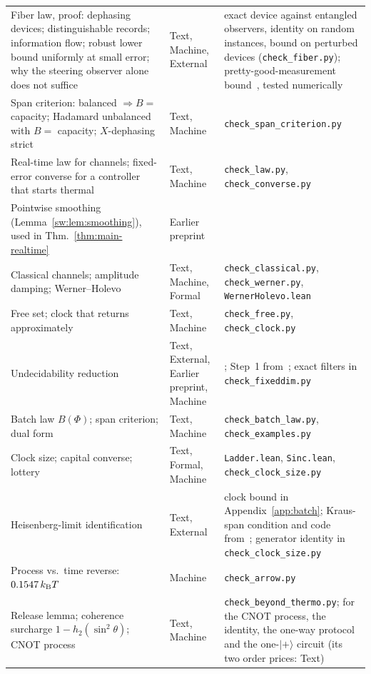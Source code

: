 \begin{table}[tp]
\begin{tabular}{@{}>{\raggedright\arraybackslash}p{5.6cm}>{\raggedright\arraybackslash}p{2.4cm}>{\raggedright\arraybackslash}p{7.6cm}@{}}
Fiber law, proof: dephasing devices; distinguishable records; information flow; robust lower bound uniformly at small error; why the steering observer alone does not suffice & Text, Machine, External & exact device against entangled observers, identity on random instances, bound on perturbed devices (\texttt{check\_fiber.py}); pretty-good-measurement bound~\cite{BarnumKnill02}, tested numerically\\
Span criterion: balanced $\Rightarrow B=$ capacity; Hadamard unbalanced with $B=$ capacity; $X$-dephasing strict & Text, Machine & \texttt{check\_span\_criterion.py}\\
Real-time law for channels; fixed-error converse for a controller that starts thermal & Text, Machine & \texttt{check\_law.py}, \texttt{check\_converse.py}\\
Pointwise smoothing (Lemma~\ref{sw:lem:smoothing}), used in Thm.~\ref{thm:main-realtime} & Earlier preprint & \cite[Thm.~4.1, Cor.~4.3]{Douglas26closed}\\
Classical channels; amplitude damping; Werner--Holevo & Text, Machine, Formal & \texttt{check\_classical.py}, \texttt{check\_werner.py}, \texttt{WernerHolevo.lean}\\
Free set; clock that returns approximately & Text, Machine & \texttt{check\_free.py}, \texttt{check\_clock.py}\\
Undecidability reduction & Text, External, Earlier preprint, Machine & \cite{FMS,KPS18,MusatRordam,Musat25}; Step~1 from~\cite[Thm.~3.2(a)]{Memory}; exact filters in \texttt{check\_fixeddim.py}\\
Batch law $B(\Phi)$; span criterion; dual form & Text, Machine & \texttt{check\_batch\_law.py}, \texttt{check\_examples.py}\\
Clock size; capital converse; lottery & Text, Formal, Machine & \texttt{Ladder.lean}, \texttt{Sinc.lean}, \texttt{check\_clock\_size.py}\\
Heisenberg-limit identification & Text, External & clock bound in Appendix~\ref{app:batch}; Kraus-span condition and code from~\cite{ZhouJiang21}; generator identity in \texttt{check\_clock\_size.py}\\
Process vs.\ time reverse: $0.1547\,k_{\mathrm B} T$ & Machine & \texttt{check\_arrow.py}\\
Release lemma; coherence surcharge $1-h_2(\sin^2\theta)$; CNOT process & Text, Machine & \texttt{check\_beyond\_thermo.py}; for the CNOT process, the identity, the one-way protocol and the one-$|{+}\rangle$ circuit (its two order prices: Text)\\

\end{tabular}
\end{table}

